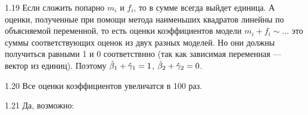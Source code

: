 \protect \hypertarget {soln:1.19}{}
\begin{solution}{{1.19}}
Если сложить попарно $m_i$ и $f_i$, то в сумме всегда выйдет единица. А оценки, полученные при помощи метода наименьших квадратов линейны по объясняемой переменной, то есть оценки коэффициентов модели $m_i+f_i \sim \dots$ это суммы соответствующих оценок из двух разных моделей. Но они должны получиться равными 1 и 0 соответствнно (так как зависимая переменная — вектор из единиц). Поэтому $\hat{\beta}_1 + \hat{\gamma}_1 = 1$, $\hat{\beta}_2 + \hat{\gamma}_2 = 0$.
\end{solution}
\protect \hypertarget {soln:1.20}{}
\begin{solution}{{1.20}}
Все оценки коэффициентов увеличатся в 100 раз.
\end{solution}
\protect \hypertarget {soln:1.21}{}
\begin{solution}{{1.21}}
Да, возможно:
\begin{knitrout}
\color{fgcolor}\begin{kframe}
\begin{alltt}
\hlstd{(}\hlstd{,}  \hlstd{=} \hlstd{,}  \hlstd{=} \hlstd{)}
 \hlkwb{<-} \hlstd{(}  \hlstd{=} \hlstd{,}  \hlstd{=} \hlstd{))}
 \hlkwb{<-}  \hlopt{-}  \hlopt{+}   \hlstd{=} \hlopt{-}\hlstd{,}  \hlstd{=} \hlstd{)}


\end{alltt}
\end{kframe}
\end{knitrout}
\end{solution}
